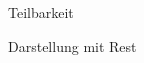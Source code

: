 \documentclass[../../main.tex]{subfiles}
\begin{document}
\begin{definition}{Teilbarkeit}
\end{definition}

\begin{definition}{Darstellung mit Rest}
\end{definition}
\end{document}
